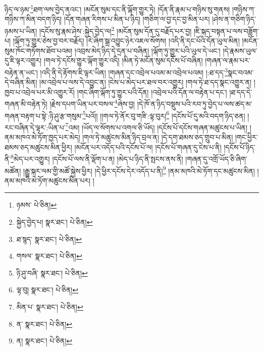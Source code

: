ཉིད་ལ་ཉམ་\footnote{ཉམས་  པེ་ཅིན། }ཐག་ལས་བྱེད་ནའང་། །མངོན་སུམ་དང་ནི་ལྐོག་གྱུར་ཏེ། །དོན་ནི་རྣམ་པ་གཉིས་སུ་གནས། །གཉིས་ཀ་གཉིས་ཀ་མིན་བདག་ཉིད། །དོན་གཞན་རིགས་པ་མིན་པ་ཉིད། །གཅིག་ལ་བྱ་དང་བྱ་མིན་པར། །ཤེས་ན་གཅིག་ཉིད་ཉམས་པ་ཡིན། །དངོས་སུ་རྣམ་ཤེས་:སྐྱེད་བྱེད་ལ།\footnote{སྐྱེད་བྱེད་པ།  སྣར་ཐང་།  པེ་ཅིན། } །མངོན་སུམ་དོན་དུ་བརྗོད་པར་བྱ། །ཇི་སྐད་བསྟན་པ་ལས་བཟློག་པ། །ལྐོག་ཏུ་གྱུར་ཅེས་བྱ་བར་བརྗོད། །རེ་ཞིག་སྒྲ་འབྱུང་ཉེར་འཇལ་སོགས། །འདི་ནི་དང་པོའི་དོན་ཡུལ་མིན། །མངོན་སུམ་ཁོང་གཏོགས་ཐོབ་པའམ། །འབྲས་མེད་ཉིད་དེ་དྲན་པ་བཞིན། །ལྐོག་ཏུ་གྱུར་པའི་ཡུལ་དེ་ཡང་། །དེ་རྣམས་ཡུལ་དུ་ཇི་ལྟར་འགྱུར། །གལ་ཏེ་དངོས་གྱུར་ལྐོག་གྱུར་འདི། །མིན་ཏེ་མངོན་སུམ་དངོས་པོ་བཞིན། །གཞན་ལ་རྣམ་པར་བརྟེན་ན་ཡང་། །འདི་ནི་དེ་རྟོགས་ཇི་ལྟར་ཡིན། །གཞན་དང་འབྲེལ་པའམ་མ་འབྲེལ་པའམ། །:ཐ་དད་\footnote{ཐ་སྙད་  སྣར་ཐང་།  པེ་ཅིན། }སྣང་བའམ་དེ་བཞིན་མིན། །མ་འབྲེལ་པ་ལས་དེ་འབྱུང་ན། །ངེས་པ་མེད་པར་ཐལ་བར་འགྱུར། །གལ་ཏེ་ཐ་དད་སྣང་འགྱུར་ན། །ཁྱབ་པ་འབྲེལ་པར་མི་འགྱུར་རོ། །གང་ཞིག་ལྐོག་ཏུ་གྱུར་པའི་དོན། །འབྲེལ་པའི་དོན་ལ་བརྟེན་པ་དང་། །ཐ་དད་དེ་གཞན་མི་བརྟེན་ཏེ། །རྗེས་དཔག་ཡིན་པར་བསལ་\footnote{གསལ་  སྣར་ཐང་།  པེ་ཅིན། }ཞེས་བྱ། །དེ་ཁོ་ན་ཉིད་བསྡུས་པའི་རབ་ཏུ་བྱེད་པ་ལས་ཚད་མ་གཞན་བརྟག་པ་སྟེ་:ཉི་ཤུ་རྩ་གསུམ་\footnote{ཉི་ཤུ་བཞི་  སྣར་ཐང་།  པེ་ཅིན། }པའོ།། །།གལ་ཏེ་ནོར་བུ་གཟི་:ལྟ་བུར།\footnote{ལྟ་བུ།  སྣར་ཐང་།  པེ་ཅིན། } །དངོས་པོ་དུ་མའི་བདག་ཉིད་ཅན། །རང་བཞིན་དེ་ལྟར་:ཡིན་པ་\footnote{མིན་པ་  སྣར་ཐང་།  པེ་ཅིན། }འམ། །ཡོད་ལ་སོགས་པ་འགལ་ཅི་ཡོད། །དངོས་པོ་དངོས་གཞན་མཚུངས་པ་ཡིན། །ནམ་མཁའ་མེ་ཏོག་ཁྱད་པར་མེད། །གལ་ཏེ་མཚུངས་མིན་ཉིད་བྲལ་ན། །དེ་དག་ཐམས་ཅད་གྲུབ་པ་མིན། །གང་ཕྱིར་ཐམས་ཅད་མཚུངས་མིན་ཕྱིར། །མངོན་པར་འདོད་པའི་དངོས་པོ་ལ། །དངོས་པོ་གཞན་དུ་ངེས་པ་ནི། །དངོས་པོ་ཉིད་ནི་\footnote{ན་  སྣར་ཐང་།  པེ་ཅིན། }མེད་པར་འགྱུར། །དངོས་པོ་ལས་ནི་ལྡོག་པ་ན། །མེད་པ་ཉིད་ནི་སྤངས་ནས་ནི། །གཞན་དུ་འགྲོ་ཡོད་ཅི་ཞིག་མཚོན། །རྒྱུ་སྐར་ལམ་གྱི་མཚོ་སྐྱེས་ཕྱིར། །དེ་ཕྱིར་དངོས་དེར་འདོད་པ་ནི།\footnote{ན།  སྣར་ཐང་།  པེ་ཅིན། } །ནམ་མཁའི་མེ་ཏོག་དང་མཚུངས་མིན། །ནམ་མཁའི་མེ་ཏོག་མཚུངས་མིན་པར། །
